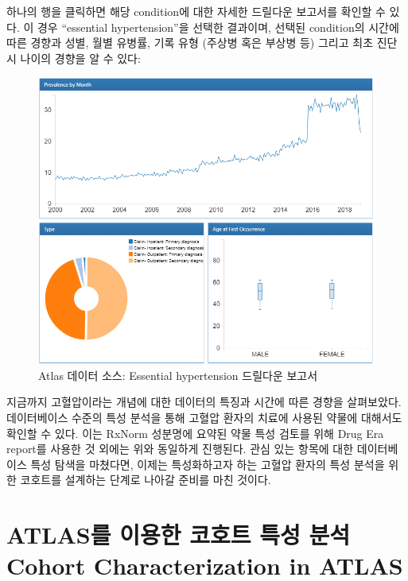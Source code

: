 \documentclass[11pt]{book}
\theoremstyle{definition}
\theoremstyle{definition}
\theoremstyle{definition}
\theoremstyle{remark}
\begin{document}
하나의 행을 클릭하면 해당 condition에 대한 자세한 드릴다운 보고서를
확인할 수 있다. 이 경우 ``essential hypertension''을 선택한 결과이며,
선택된 condition의 시간에 따른 경향과 성별, 월별 유병률, 기록 유형
(주상병 혹은 부상병 등) 그리고 최초 진단 시 나이의 경향을 알 수 있다:

\begin{figure}

{\centering \includegraphics[width=1\linewidth]{images/Characterization/atlasDataSourcesDrillDownReport} 

}

\caption{Atlas 데이터 소스: Essential hypertension 드릴다운 보고서}\label{fig:atlasDataSourcesDrillDownReport}
\end{figure}

지금까지 고혈압이라는 개념에 대한 데이터의 특징과 시간에 따른 경향을
살펴보았다. 데이터베이스 수준의 특성 분석을 통해 고혈압 환자의 치료에
사용된 약물에 대해서도 확인할 수 있다. 이는 RxNorm 성분명에 요약된 약물
특성 검토를 위해 Drug Era report를 사용한 것 외에는 위와 동일하게
진행된다. 관심 있는 항목에 대한 데이터베이스 특성 탐색을 마쳤다면,
이제는 특성화하고자 하는 고혈압 환자의 특성 분석을 위한 코호트를
설계하는 단계로 나아갈 준비를 마친 것이다.

\section{ATLAS를 이용한 코호트 특성 분석 Cohort Characterization in
ATLAS}\label{atlas-----cohort-characterization-in-atlas}
\end{document}

